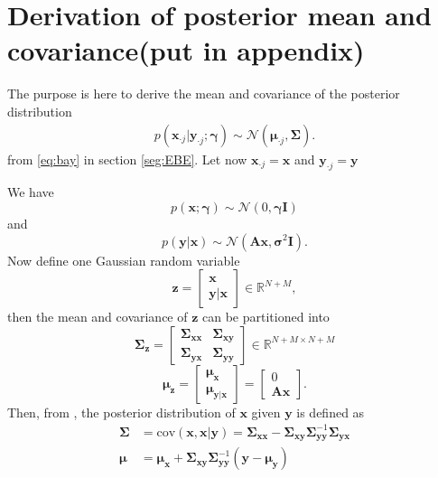 \section{Derivation of posterior  mean and covariance(put in appendix)}\label{app_sec:mean_cov}
The purpose is here to derive the mean and covariance of the posterior distribution
\begin{align*}
p\left( \textbf{x}_{\cdot j} \vert \textbf{y}_{\cdot j}; \boldsymbol{\gamma}\right) \sim \mathcal{N}(\boldsymbol{\mu} _{\cdot j},\boldsymbol{\Sigma}).
\end{align*}
from \eqref{eq:bay} in section \ref{seg:EBE}. Let now $\textbf{x}_{\cdot j} = \textbf{x}$ and $\textbf{y}_{\cdot j} = \textbf{y}$

We have 
$$
p(\textbf{x};\boldsymbol{\gamma}) \sim \mathcal{N}(0,\boldsymbol{\gamma} \textbf{I} )
$$
and 
$$
p(\textbf{y}\vert \textbf{x}) \sim \mathcal{N}(\textbf{A}\textbf{x}, \boldsymbol{\sigma}^2\textbf{I}).
$$ 
Now define one Gaussian random variable  
$$
\textbf{z} = \begin{bmatrix}
\textbf{x} \\ 
\textbf{y}\vert \textbf{x} 
\end{bmatrix} \in \mathbb{R}^{N + M},	
$$   
then the mean and covariance of $\textbf{z}$ can be partitioned into 
$$
\boldsymbol{\Sigma}_{\textbf{z}} = \begin{bmatrix}
\boldsymbol{\Sigma}_{\textbf{x}\textbf{x}} & \boldsymbol{\Sigma}_{\textbf{x}\textbf{y}} \\ 
\boldsymbol{\Sigma}_{\textbf{y}\textbf{x}} & \boldsymbol{\Sigma}_{\textbf{y}\textbf{y}}
\end{bmatrix} \in \mathbb{R}^{N+M \times N+M}
$$
$$
\boldsymbol{\mu}_{\textbf{z}}  = \begin{bmatrix}
\boldsymbol{\mu}_{\textbf{x}}  \\ 
 \boldsymbol{\mu}_{\textbf{y}\vert \textbf{x}}
\end{bmatrix} = 
 \begin{bmatrix}
0  \\ 
\textbf{A}\textbf{x}
\end{bmatrix}.
$$
Then, from \cite{conditional_cov}, the posterior distribution of $\textbf{x}$ given $\textbf{y}$ is defined as
\begin{align*}
\boldsymbol{\Sigma} &= \text{cov}(\textbf{x},\textbf{x}\vert \textbf{y}) =  \boldsymbol{\Sigma}_{\textbf{xx}} - \boldsymbol{\Sigma}_{\textbf{xy}}\boldsymbol{\Sigma}_{\textbf{yy}}^{-1}\boldsymbol{\Sigma}_{\textbf{yx}} \\
\boldsymbol{\mu} &= \boldsymbol{\mu}_{\textbf{x}}+\boldsymbol{\Sigma}_{\textbf{xy}}\boldsymbol{\Sigma}_{\textbf{yy}}^{-1}(\textbf{y}-\boldsymbol{\mu}_{\textbf{y}})
\end{align*}
